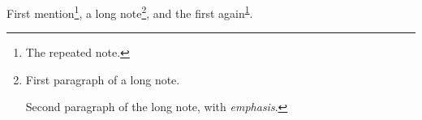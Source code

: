 First mention\footnote{\label{jmdfn:r}The repeated note.}, a long note\footnote{First paragraph of a long note.

Second paragraph of the long note, with \emph{emphasis}.}, and the first again\textsuperscript{\ref{jmdfn:r}}.

